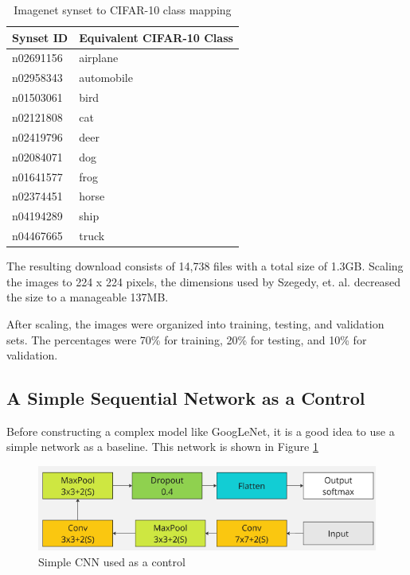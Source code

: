 \documentclass{article}
\begin{document}
\begin{table}[ht]
    \centering
    \begin{tabular}{ll}
    \hline
    \textbf{Synset ID} & \textbf{Equivalent CIFAR-10 Class} \\ \hline
    n02691156 & airplane \\ \hline
    n02958343 & automobile \\ \hline
    n01503061 & bird \\ \hline
    n02121808 & cat \\ \hline
    n02419796 & deer \\ \hline
    n02084071 & dog \\ \hline
    n01641577 & frog \\ \hline
    n02374451 & horse \\ \hline
    n04194289 & ship \\ \hline
    n04467665 & truck \\ \hline
    \end{tabular}
    \caption{Imagenet synset to CIFAR-10 class mapping}
    \label{tab:synsets}
\end{table}

The resulting download consists of 14,738 files with a total size of 1.3GB. Scaling the images to 224 x 224 pixels, the dimensions used by Szegedy, et. al. decreased the size to a manageable 137MB.

After scaling, the images were organized into training, testing, and validation sets. The percentages were 70\% for training, 20\% for testing, and 10\% for validation.

\subsection{A Simple Sequential Network as a Control}
Before constructing a complex model like GoogLeNet, it is a good idea to use a simple network as a baseline. This network is shown in Figure \ref{fig:cnn-control}

\begin{figure}[ht]
    \centering
    \includegraphics[scale=0.7]{project/paper_images/control_cnn.png}
    \caption{Simple CNN used as a control}
    \label{fig:cnn-control}
\end{figure}
\end{document}
